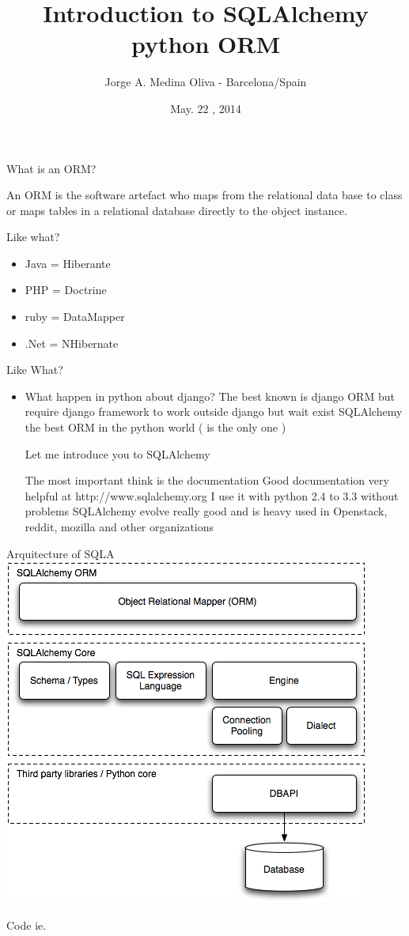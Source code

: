 \documentclass[seagull]{beamer}
\author{Jorge A. Medina Oliva - Barcelona/Spain}
\title{Introduction to SQLAlchemy python ORM}
\date{May. 22 , 2014}
\begin{document}
\begin{frame}
\titlepage
\end{frame}


\begin{frame}{What is an ORM?}

An ORM is the software artefact who maps from the relational data base to class 
or maps tables in a relational database directly to the object instance.

\end{frame}

\begin{frame}{Like what?}
\begin{itemize}
	\item Java = Hiberante
	\item PHP = Doctrine
	\item ruby = DataMapper
	\item .Net = NHibernate
\end{itemize}
\end{frame}

\begin{frame}{Like What?}
\begin{itemize}
	\item What happen in python about django?
The best known is django ORM but require django framework to work outside django
but wait exist SQLAlchemy the best ORM in the python world ( is the only one )

Let me introduce you to SQLAlchemy

The most important think is the documentation
Good documentation very helpful at http://www.sqlalchemy.org
I use it with python 2.4 to  3.3 without problems
SQLAlchemy evolve really good and is heavy used in Openstack, reddit, mozilla and other organizations
\end{itemize}
\end{frame}

\begin{frame}{Arquitecture of SQLA}
	\centering\includegraphics[scale=0.5]{sqla-arch.png}
\end{frame}

\begin{frame}{Code ie.}

\end{frame}

\end{document}
